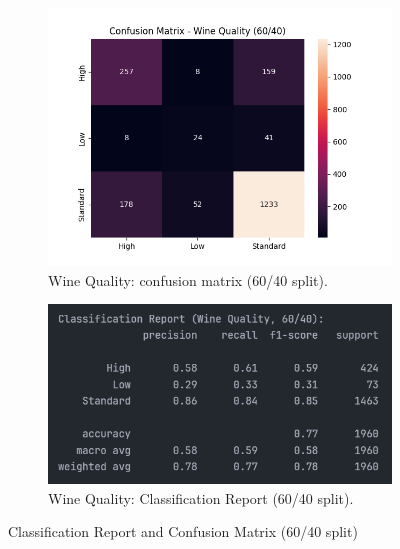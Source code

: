 \begin{figure}[H]
	\centering
	\begin{subfigure}{0.45\textwidth}
		\centering
		\includegraphics[width=\textwidth]{imgs/confusion_mat/confusion_mat__wine_quality__60_vs_40.png}
		\caption{Wine Quality: confusion matrix (60/40 split).}\label{fig:wq-cm-60-40}
	\end{subfigure}
	\hfill
	\begin{subfigure}{0.45\textwidth}
		\centering
		\includegraphics[width=\textwidth]{imgs/confusion_mat/class_rp__wine_quality__60_vs_40.png}
		\caption{Wine Quality: Classification Report (60/40 split).}\label{fig:wq-cr-60-40}
	\end{subfigure}

	\caption{Classification Report and Confusion Matrix (60/40 split)}\label{fig:wq-eval-60-40}
\end{figure}
